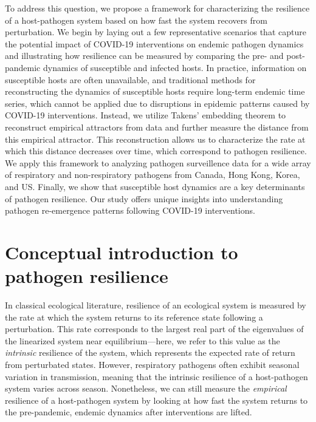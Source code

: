 \documentclass[12pt]{article}
\newcommand{\comment}{\showcomment}
\newcommand{\showcomment}[3]{\textcolor{#1}{\textbf{[#2: }\textsl{#3}\textbf{]}}}
\newcommand{\swp}[1]{\comment{magenta}{SWP}{#1}}
\begin{document}
To address this question, we propose a framework for characterizing the resilience of a host-pathogen system based on how fast the system recovers from perturbation.
We begin by laying out a few representative scenarios that capture the potential impact of COVID-19 interventions on endemic pathogen dynamics and illustrating how resilience can be measured by comparing the pre- and post-pandemic dynamics of susceptible and infected hosts.
In practice, information on susceptible hosts are often unavailable, and traditional methods for reconstructing the dynamics of susceptible hosts require long-term endemic time series, which cannot be applied due to disruptions in epidemic patterns caused by COVID-19 interventions.
Instead, we utilize Takens' embedding theorem to reconstruct empirical attractors from data and further measure the distance from this empirical attractor.
This reconstruction allows us to characterize the rate at which this distance decreases over time, which correspond to pathogen resilience.
We apply this framework to analyzing pathogen surveillence data for a wide array of respiratory and non-respiratory pathogens from Canada, Hong Kong, Korea, and US.
Finally, we show that susceptible host dynamics are a key determinants of pathogen resilience.
Our study offers unique insights into understanding pathogen re-emergence patterns following COVID-19 interventions.
 
\section*{Conceptual introduction to pathogen resilience}

In classical ecological literature, resilience of an ecological system is measured by the rate at which the system returns to its reference state following a perturbation.
This rate corresponds to the largest real part of the eigenvalues of the linearized system near equilibrium---here, we refer to this value as the \emph{intrinsic} resilience of the system, which represents the expected rate of return from perturbated states.
However, respiratory pathogens often exhibit seasonal variation in transmission, meaning that the intrinsic resilience of a host-pathogen system varies across season.
Nonetheless, we can still measure the \emph{empirical} resilience of a host-pathogen system by looking at how fast the system returns to the pre-pandemic, endemic dynamics after interventions are lifted.
\end{document}
